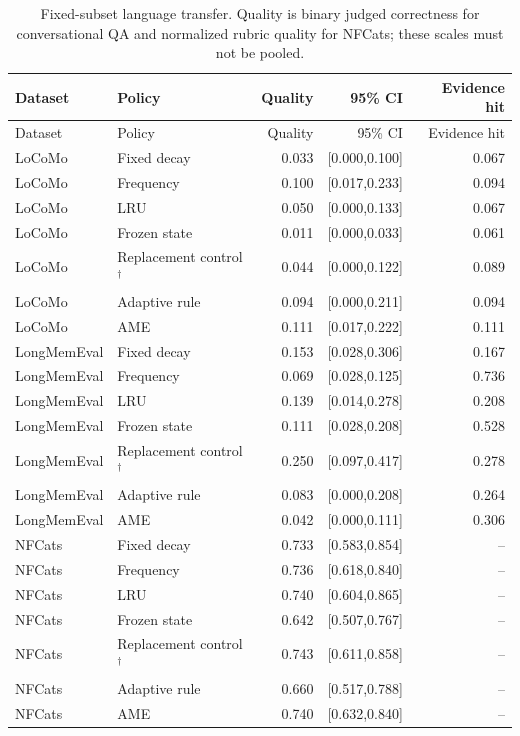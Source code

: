 \begin{longtable}{llrrr}\caption{Fixed-subset language transfer. Quality is binary judged correctness for conversational QA and normalized rubric quality for NFCats; these scales must not be pooled.}\label{tab:language}\\\toprule Dataset & Policy & Quality & 95\% CI & Evidence hit\\\midrule\endfirsthead\toprule Dataset & Policy & Quality & 95\% CI & Evidence hit\\\midrule\endhead
LoCoMo & Fixed decay & 0.033 & [0.000,0.100] & 0.067\\
LoCoMo & Frequency & 0.100 & [0.017,0.233] & 0.094\\
LoCoMo & LRU & 0.050 & [0.000,0.133] & 0.067\\
LoCoMo & Frozen state & 0.011 & [0.000,0.033] & 0.061\\
LoCoMo & Replacement control$^{\dagger}$ & 0.044 & [0.000,0.122] & 0.089\\
LoCoMo & Adaptive rule & 0.094 & [0.000,0.211] & 0.094\\
LoCoMo & AME & 0.111 & [0.017,0.222] & 0.111\\
LongMemEval & Fixed decay & 0.153 & [0.028,0.306] & 0.167\\
LongMemEval & Frequency & 0.069 & [0.028,0.125] & 0.736\\
LongMemEval & LRU & 0.139 & [0.014,0.278] & 0.208\\
LongMemEval & Frozen state & 0.111 & [0.028,0.208] & 0.528\\
LongMemEval & Replacement control$^{\dagger}$ & 0.250 & [0.097,0.417] & 0.278\\
LongMemEval & Adaptive rule & 0.083 & [0.000,0.208] & 0.264\\
LongMemEval & AME & 0.042 & [0.000,0.111] & 0.306\\
NFCats & Fixed decay & 0.733 & [0.583,0.854] & --\\
NFCats & Frequency & 0.736 & [0.618,0.840] & --\\
NFCats & LRU & 0.740 & [0.604,0.865] & --\\
NFCats & Frozen state & 0.642 & [0.507,0.767] & --\\
NFCats & Replacement control$^{\dagger}$ & 0.743 & [0.611,0.858] & --\\
NFCats & Adaptive rule & 0.660 & [0.517,0.788] & --\\
NFCats & AME & 0.740 & [0.632,0.840] & --\\
\bottomrule\end{longtable}
